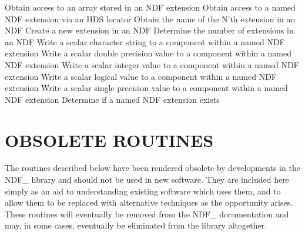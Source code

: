             {Obtain access to an array stored in an NDF extension}
            {Obtain access to a named NDF extension via an HDS locator}
            {Obtain the name of the N'th extension in an NDF}
            {Create a new extension in an NDF}
            {Determine the number of extensions in an NDF}
            {Write a scalar character string to a component within a named NDF extension}
            {Write a scalar double precision value to a component within a named NDF extension}
            {Write a scalar integer value to a component within a named NDF extension}
            {Write a scalar logical value to a component within a named NDF extension}
            {Write a scalar single precision value to a component within a named NDF extension}
     {Determine if a named NDF extension exists}

\newpage
\section{\label{ss:obsoleteroutines}OBSOLETE ROUTINES}
The routines described below have been rendered obsolete by
developments in the NDF\_ library and should not be used in new
software. They are included here simply as an aid to understanding
existing software which uses them, and to allow them to be replaced
with alternative techniques as the opportunity arises. These routines
will eventually be removed from the NDF\_ documentation and may, in
some cases, eventually be eliminated from the library altogether.

